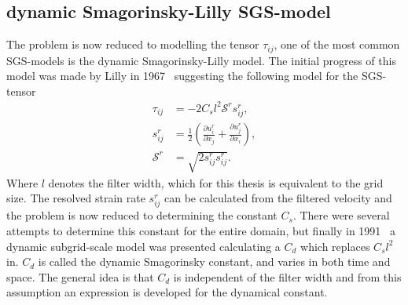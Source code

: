 \subsection{dynamic Smagorinsky-Lilly SGS-model}
The problem is now reduced to modelling the tensor $\tau_{ij}$, one of the most common SGS-models is the 
dynamic Smagorinsky-Lilly model. The initial progress of this model was made by 
Lilly in 1967~\cite{Lilly67} suggesting the following model for the SGS-tensor
%
\begin{align}
    \tau_{ij} &= -2C_sl^2\mathcal{S}^rs_{ij}^r,\\
    s^r_{ij} &= \frac{1}{2}\left( \frac{\partial u^r_i}{\partial x_j} +
    \frac{\partial u^r_j}{\partial x_i}\right),\\
    \mathcal{S}^r &= \sqrt{2s^r_{ij}s^r_{ij}}.
    \label{eq:boussinesq}
\end{align}
%
Where $l$ denotes the filter width, which for this thesis is equivalent to the grid size.
The resolved strain rate $s^r_{ij}$ can be calculated from the filtered velocity and the problem is now reduced to determining
the constant $C_s$. There were several attempts to determine this constant for the entire domain,
but finally in 1991~\cite{Germano91} a dynamic subgrid-scale model was presented calculating a 
$C_d$ which replaces $C_sl^2$ in. $C_d$ is called the dynamic Smagorinsky constant, and varies in both time and space.
The general idea is that $C_d$ is independent of the filter width and from this 
assumption an expression is developed for the dynamical constant.


